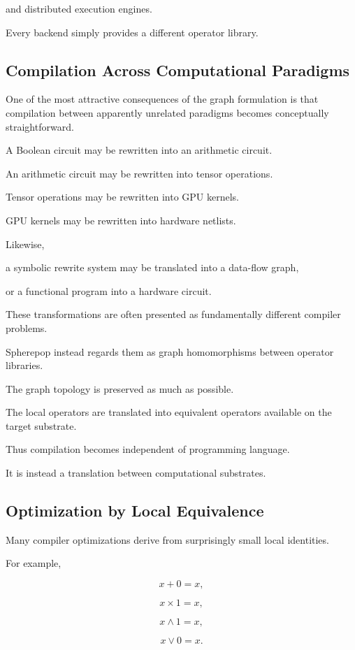 \documentclass[12pt,oneside]{article}
\begin{document}
and distributed execution engines.

Every backend simply provides a different operator library.

\subsection{Compilation Across Computational Paradigms}

One of the most attractive consequences of the graph formulation is that compilation between apparently unrelated paradigms becomes conceptually straightforward.

A Boolean circuit may be rewritten into an arithmetic circuit.

An arithmetic circuit may be rewritten into tensor operations.

Tensor operations may be rewritten into GPU kernels.

GPU kernels may be rewritten into hardware netlists.

Likewise,

a symbolic rewrite system may be translated into a data-flow graph,

or a functional program into a hardware circuit.

These transformations are often presented as fundamentally different compiler problems.

Spherepop instead regards them as graph homomorphisms between operator libraries.

The graph topology is preserved as much as possible.

The local operators are translated into equivalent operators available on the target substrate.

Thus compilation becomes independent of programming language.

It is instead a translation between computational substrates.

\subsection{Optimization by Local Equivalence}

Many compiler optimizations derive from surprisingly small local identities.

For example,

\[
x+0=x,
\]

\[
x\times1=x,
\]

\[
x\land1=x,
\]

\[
x\lor0=x.
\]
\end{document}
